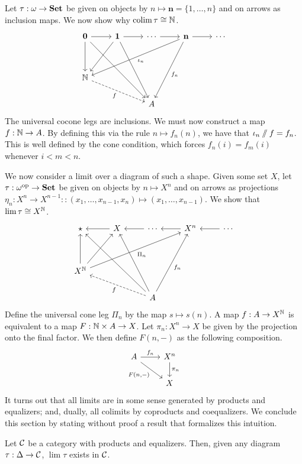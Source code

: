Let $\tau:\omega\to\mathbf{Set}$ be given on objects by $n\mapsto\mathbf{n}=\{1,\dots,n\}$ and on arrows as inclusion maps. We now show why $\operatorname{colim}\tau\cong\mathbb N$.
\[ 
\begin{tikzcd}
\mathbf{0}\arrow[r]\arrow[dd] \arrow[dddrr] & \mathbf{1}\arrow[r]\arrow[ddl] \arrow[dddr] &\cdots \arrow[r]&\mathbf{n}\arrow[r]\arrow[ddlll,"\iota_n"]\arrow[dddl,"f_n"] &\cdots \\
\\
\NN \arrow[drr,dashed,"f"']\\
& & A
\end{tikzcd}
\]
The universal cocone legs are inclusions. We must now construct a map $f:\mathbb N\to A$. By defining this via the rule $n\mapsto f_n(n)$, we have that $\iota_n\sslash f=f_n$. This is well defined by the cone condition, which forces $f_n(i)=f_m(i)$ whenever $i<m<n$.

We now consider a limit over a diagram of such a shape. Given some set $X$, let $\tau:\omega^{\text{op}} \to\mathbf{Set}$ be given on objects by $n\mapsto X^n$ and on arrows as projections $\eta_n:X^n\to X^{n-1}::(x_1,\dots,x_{n-1},x_n)\mapsto (x_1,\dots,x_{n-1})$. We show that $\lim\tau\cong X^{\mathbb N}$.
\[ 
\begin{tikzcd}
\star & X\arrow[l] &\cdots \arrow[l]&X^n\arrow[l] &\cdots \arrow[l]\\
\\
 X^{\NN}  \arrow[uu] \arrow[uur] \arrow[uurrr,"\Pi_n"'] \\
& & A \arrow[uuull]\arrow[uuul]\arrow[uuur,"f_n"'] \arrow[ull,dashed,"f"]
\end{tikzcd}
\]
Define the universal cone leg $\Pi_n$ by the map $s\mapsto s(n)$. A map $f:A\to X^{\mathbb N}$ is equivalent to a map $F:\mathbb N\times A\to X$. Let $\pi_n:X^n\to X$ be given by the projection onto the final factor. We then define $F(n,-)$ as the following composition.
\[
\begin{tikzcd}
A\arrow[r,"f_n"] \arrow[dr,"{F(n,-)}"'] & X^n \arrow[d,"\pi_n"] \\
& X 
\end{tikzcd}
\]
It turns out that all limits are in some sense generated by products and equalizers; and, dually, all colimits by coproducts and coequalizers. We conclude this section by stating without proof a result that formalizes this intuition.

\begin{prop}
Let $\mathcal{C}$ be a category with products and equalizers. Then, given any diagram $\tau:\Delta\to\mathcal{C}$, $\lim\tau$ exists in $\mathcal{C}$.
\end{prop}